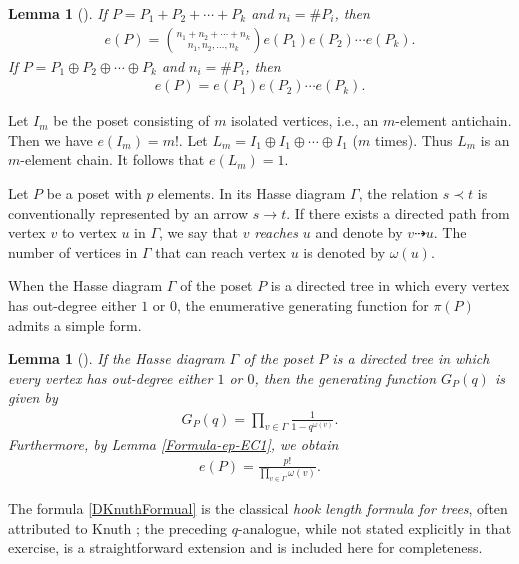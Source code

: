 \documentclass[reqno, 12pt]{article}
\newtheorem{lem}[thm]{Lemma}
\theoremstyle{mydefinition}
\theoremstyle{myremark}
\numberwithin{algorithm}{section}
\begin{document}
\begin{lem}[]\label{Lem-Direct-sum-ep}
If $P=P_1+P_2+\cdots +P_k$ and $n_i=\#P_i$, then
\begin{align*}
e(P)=\binom{n_1+n_2+\cdots +n_k}{n_1,n_2,\ldots,n_k} e(P_1)e(P_2)\cdots e(P_k).
\end{align*}
If $P=P_1\oplus P_2\oplus \cdots \oplus P_k$ and $n_i=\#P_i$, then
\begin{align*}
e(P)=e(P_1)e(P_2)\cdots e(P_k).
\end{align*}
\end{lem}

Let $I_m$ be the poset consisting of $m$ isolated vertices, i.e., an $m$-element antichain.
Then we have $e(I_m)=m!$.
Let $L_m=I_1\oplus I_1\oplus \cdots \oplus I_1$ ($m$ times). Thus $L_m$ is an $m$-element chain. It follows that $e(L_m)=1$.


Let $P$ be a poset with $p$ elements.
In its Hasse diagram $\Gamma$, the relation $s \prec t$ is conventionally represented by an arrow $s \to t$.
If there exists a directed path from vertex $v$ to vertex $u$ in $\Gamma$, we say that $v$ \emph{reaches} $u$ and denote by $v \dashrightarrow u$.
The number of vertices in $\Gamma$ that can reach vertex $u$ is denoted by $\omega(u)$.

When the Hasse diagram $\Gamma$ of the poset $P$ is a directed tree in which every vertex has out-degree either $1$ or $0$, the enumerative generating function for $\pi(P)$ admits a simple form.

\begin{lem}[]\label{LTX-Outdegree-10}
If the Hasse diagram $\Gamma$ of the poset $P$ is a directed tree in which every vertex has out-degree either $1$ or $0$, then the generating function $G_P(q)$ is given by
\begin{align*}
G_P(q)=\prod_{v\in \Gamma}\frac{1}{1 - q^{\omega(v)}}.
\end{align*}
Furthermore, by Lemma \ref{Formula-ep-EC1}, we obtain
\begin{align}\label{DKnuthFormual}
e(P)=\frac{p!}{\prod_{v\in \Gamma} \omega(v)}.
\end{align}
\end{lem}

The formula \eqref{DKnuthFormual} is the classical \emph{hook length formula for trees}, often attributed to Knuth \cite[Exercise 20, Page 70]{KnuthBook};
the preceding $q$-analogue, while not stated explicitly in that exercise, is a straightforward extension and is included here for completeness.
\end{document}
